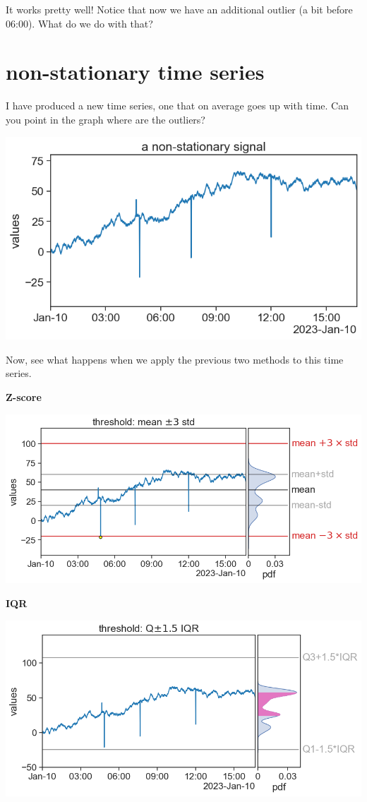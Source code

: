 \documentclass[
  letterpaper,
  DIV=11,
  numbers=noendperiod,
  oneside]{scrreprt}
\begin{document}
It works pretty well! Notice that now we have an additional outlier (a
bit before 06:00). What do we do with that?

\hypertarget{non-stationary-time-series}{%
\section{non-stationary time series}\label{non-stationary-time-series}}

I have produced a new time series, one that on average goes up with
time. Can you point in the graph where are the outliers?

\includegraphics{outliers/signal_40_non_stationary.png}

Now, see what happens when we apply the previous two methods to this
time series.

\textbf{Z-score}

\includegraphics{outliers/outliers_3sigma_seed40.png}

\textbf{IQR}

\includegraphics{outliers/outliers_1.5IQR_seed40.png}
\end{document}
